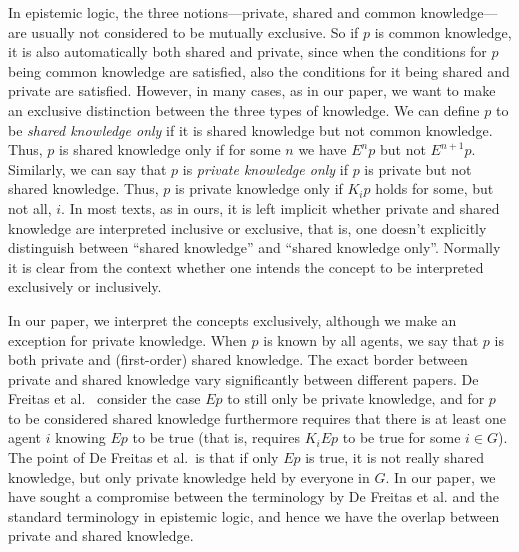 In epistemic logic, the three notions---private, shared and common knowledge---are usually not considered to be mutually exclusive. So if $p$ is common knowledge, it is also automatically both shared and private, since when the conditions for $p$ being common knowledge are satisfied, also the conditions for it being shared and private are satisfied. However, in many cases, as in our paper, we want to make an exclusive distinction between the three types of knowledge. We can define $p$ to be \emph{shared knowledge only} if it is shared knowledge but not common knowledge. Thus, $p$ is shared knowledge only if for some $n$ we have $E^n p$ but not $E^{n+1} p$. Similarly, we can say that $p$ is \emph{private knowledge only} if $p$ is private but not shared knowledge. Thus, $p$ is private knowledge only if $K_i p$ holds for some, but not all, $i$. In most texts, as in ours, it is left implicit whether private and shared knowledge are interpreted inclusive or exclusive, that is, one doesn't explicitly distinguish between ``shared knowledge'' and ``shared knowledge only''. Normally it is clear from the context whether one intends the concept to be interpreted exclusively or inclusively. 

In our paper, we interpret the concepts exclusively, although we make an exception for private knowledge. When $p$ is known by all agents, we say that $p$ is both private and (first-order) shared knowledge. The exact border between private and shared knowledge vary significantly between different papers. De Freitas et al.~\cite{de2019common} consider the case $E p$ to still only be private knowledge, and for $p$ to be considered shared knowledge furthermore requires that there is at least one agent $i$ knowing $E p$ to be true (that is, requires $K_i E p$ to be true for some $i \in G$). The point of De Freitas et al.\ is that if only $E p$ is true, it is not really shared knowledge, but only private knowledge held by everyone in $G$. In our paper, we have sought a compromise between the terminology by De Freitas et al. and the standard terminology in epistemic logic, and hence we have the overlap between private and shared knowledge.

